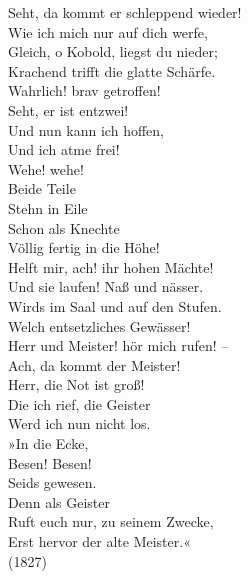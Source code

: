 {		Seht, da kommt er schleppend wieder! \\
		Wie ich mich nur auf dich werfe, \\
		Gleich, o Kobold, liegst du nieder; \\ 
		Krachend trifft die glatte Schärfe. \\
		Wahrlich! brav getroffen! \\
		Seht, er ist entzwei! \\
		Und nun kann ich hoffen, \\ 
		Und ich atme frei! \\
		
		Wehe! wehe! \\
		Beide Teile \\
		Stehn in Eile \\
		Schon als Knechte \\ 
		Völlig fertig in die Höhe! \\
		Helft mir, ach! ihr hohen Mächte! \\
						
		Und sie laufen! Naß und nässer. \\
		Wirds im Saal und auf den Stufen. \\
		Welch entsetzliches Gewässer! \\
		Herr und Meister! hör mich rufen! – \\
		Ach, da kommt der Meister! \\
		Herr, die Not ist groß! \\
		Die ich rief, die Geister \\
		Werd ich nun nicht los.\\
		
		»In die Ecke, \\
		Besen! Besen! \\
		Seids gewesen. \\
		Denn als Geister \\
		Ruft euch nur, zu seinem Zwecke, \\
		Erst hervor der alte Meister.« \\
		
		(1827) \\	
	}	
{}
\clearpage
\artikelohnevorspann{}
